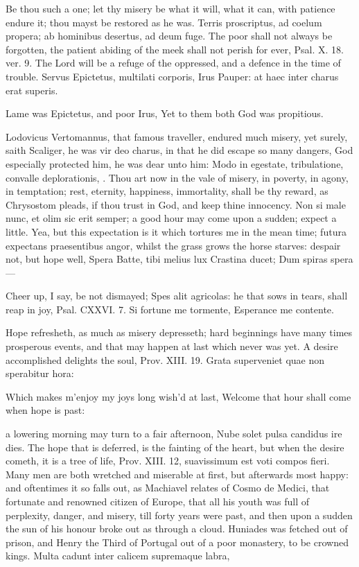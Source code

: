 {Be thou such a one; let thy misery be what it will, what it can, with
patience endure it; thou mayst be restored as he was. Terris
proscriptus, ad coelum propera; ab hominibus desertus, ad deum fuge.
The poor shall not always be forgotten, the patient abiding of the meek
shall not perish for ever, Psal. X. 18. ver. 9. The Lord will be a
refuge of the oppressed, and a defence in the time of trouble.
Servus Epictetus, multilati corporis, Irus
Pauper: at haec inter charus erat superis.

Lame was Epictetus, and poor Irus,
Yet to them both God was propitious.

Lodovicus Vertomannus, that famous traveller, endured much misery, yet
surely, saith Scaliger, he was vir deo charus, in that he did escape so
many dangers, God especially protected him, he was dear unto him: Modo
in egestate, tribulatione, convalle deplorationis, \etc{}. Thou art now in
the vale of misery, in poverty, in agony, in temptation; rest,
eternity, happiness, immortality, shall be thy reward, as Chrysostom
pleads, if thou trust in God, and keep thine innocency. Non si male
nunc, et olim sic erit semper; a good hour may come upon a sudden;
 expect a little.
Yea, but this expectation is it which tortures me in the mean time;
 futura expectans praesentibus angor, whilst the grass grows the
horse starves: despair not, but hope well,
Spera Batte, tibi melius lux Crastina ducet;
Dum spiras spera---

Cheer up, I say, be not dismayed; Spes alit agricolas: he that sows in
tears, shall reap in joy, Psal. CXXVI. 7.
Si fortune me tormente,
Esperance me contente.

Hope refresheth, as much as misery depresseth; hard beginnings have
many times prosperous events, and that may happen at last which never
was yet. A desire accomplished delights the soul, Prov. XIII. 19.
Grata superveniet quae non sperabitur hora:

Which makes m'enjoy my joys long wish'd at last,
Welcome that hour shall come when hope is past:

a lowering morning may turn to a fair afternoon, Nube solet pulsa
candidus ire dies. The hope that is deferred, is the fainting of the
heart, but when the desire cometh, it is a tree of life, Prov. XIII.
12, suavissimum est voti compos fieri. Many men are both wretched
and miserable at first, but afterwards most happy: and oftentimes it so
falls out, as Machiavel relates of Cosmo de Medici, that
fortunate and renowned citizen of Europe, that all his youth was full
of perplexity, danger, and misery, till forty years were past, and then
upon a sudden the sun of his honour broke out as through a cloud.
Huniades was fetched out of prison, and Henry the Third of Portugal out
of a poor monastery, to be crowned kings.
Multa cadunt inter calicem supremaque labra,

}
